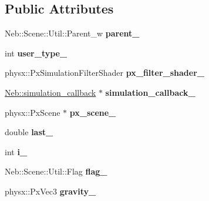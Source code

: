 \subsection*{Public Attributes}
\begin{DoxyCompactItemize}
\item 
\hypertarget{classNeb_1_1Scene_1_1Base_aff1e6fae13c98a7aea6790a698dac725}{Neb\-::\-Scene\-::\-Util\-::\-Parent\-\_\-w {\bfseries parent\-\_\-}}\label{classNeb_1_1Scene_1_1Base_aff1e6fae13c98a7aea6790a698dac725}

\item 
\hypertarget{classNeb_1_1Scene_1_1Base_a9565c11540a076e5aacf5cc072a1a7eb}{int {\bfseries user\-\_\-type\-\_\-}}\label{classNeb_1_1Scene_1_1Base_a9565c11540a076e5aacf5cc072a1a7eb}

\item 
\hypertarget{classNeb_1_1Scene_1_1Base_aed874c0aa2d03387a5a126cdd0fe76e6}{physx\-::\-Px\-Simulation\-Filter\-Shader {\bfseries px\-\_\-filter\-\_\-shader\-\_\-}}\label{classNeb_1_1Scene_1_1Base_aed874c0aa2d03387a5a126cdd0fe76e6}

\item 
\hypertarget{classNeb_1_1Scene_1_1Base_a234a837620e5d08bc794ae589d1b7b3a}{\hyperlink{classNeb_1_1simulation__callback}{Neb\-::simulation\-\_\-callback} $\ast$ {\bfseries simulation\-\_\-callback\-\_\-}}\label{classNeb_1_1Scene_1_1Base_a234a837620e5d08bc794ae589d1b7b3a}

\item 
\hypertarget{classNeb_1_1Scene_1_1Base_ac1716b66b914b8fd8e04f2de16eff4b6}{physx\-::\-Px\-Scene $\ast$ {\bfseries px\-\_\-scene\-\_\-}}\label{classNeb_1_1Scene_1_1Base_ac1716b66b914b8fd8e04f2de16eff4b6}

\item 
\hypertarget{classNeb_1_1Scene_1_1Base_a9c2b45c827982c73a5601f03085095b7}{double {\bfseries last\-\_\-}}\label{classNeb_1_1Scene_1_1Base_a9c2b45c827982c73a5601f03085095b7}

\item 
\hypertarget{classNeb_1_1Scene_1_1Base_a24a4b1c10edf4b5b1656fb4764308652}{int {\bfseries i\-\_\-}}\label{classNeb_1_1Scene_1_1Base_a24a4b1c10edf4b5b1656fb4764308652}

\item 
\hypertarget{classNeb_1_1Scene_1_1Base_abd3dbc52f08bdcbb304554f595009502}{Neb\-::\-Scene\-::\-Util\-::\-Flag {\bfseries flag\-\_\-}}\label{classNeb_1_1Scene_1_1Base_abd3dbc52f08bdcbb304554f595009502}

\item 
\hypertarget{classNeb_1_1Scene_1_1Base_aba0d8709206fb88e035507117bdb2a0d}{physx\-::\-Px\-Vec3 {\bfseries gravity\-\_\-}}\label{classNeb_1_1Scene_1_1Base_aba0d8709206fb88e035507117bdb2a0d}


\end{DoxyCompactItemize}
